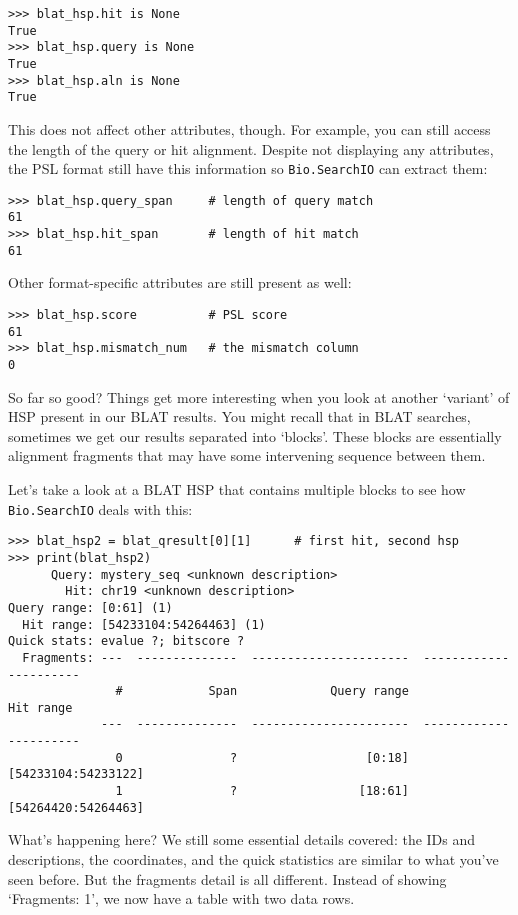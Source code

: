 \begin{verbatim}
>>> blat_hsp.hit is None
True
>>> blat_hsp.query is None
True
>>> blat_hsp.aln is None
True
\end{verbatim}

This does not affect other attributes, though. For example, you can still
access the length of the query or hit alignment. Despite not displaying any
attributes, the PSL format still have this information so \verb|Bio.SearchIO|
can extract them:

\begin{verbatim}
>>> blat_hsp.query_span     # length of query match
61
>>> blat_hsp.hit_span       # length of hit match
61
\end{verbatim}

Other format-specific attributes are still present as well:

\begin{verbatim}
>>> blat_hsp.score          # PSL score
61
>>> blat_hsp.mismatch_num   # the mismatch column
0
\end{verbatim}

So far so good? Things get more interesting when you look at another `variant'
of HSP present in our BLAT results. You might recall that in BLAT searches,
sometimes we get our results separated into `blocks'. These blocks are
essentially alignment fragments that may have some intervening sequence between
them.

Let's take a look at a BLAT HSP that contains multiple blocks to see how
\verb|Bio.SearchIO| deals with this:

\begin{verbatim}
>>> blat_hsp2 = blat_qresult[0][1]      # first hit, second hsp
>>> print(blat_hsp2)
      Query: mystery_seq <unknown description>
        Hit: chr19 <unknown description>
Query range: [0:61] (1)
  Hit range: [54233104:54264463] (1)
Quick stats: evalue ?; bitscore ?
  Fragments: ---  --------------  ----------------------  ----------------------
               #            Span             Query range               Hit range
             ---  --------------  ----------------------  ----------------------
               0               ?                  [0:18]     [54233104:54233122]
               1               ?                 [18:61]     [54264420:54264463]
\end{verbatim}

What's happening here? We still some essential details covered: the IDs and
descriptions, the coordinates, and the quick statistics are similar to what
you've seen before. But the fragments detail is all different. Instead of
showing `Fragments: 1', we now have a table with two data rows.

